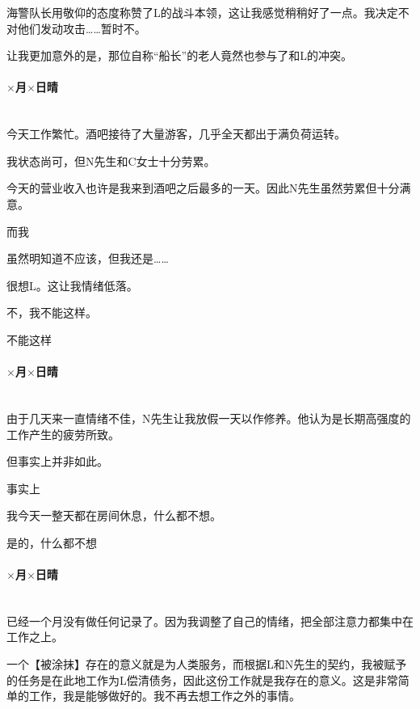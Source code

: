 海警队长用敬仰的态度称赞了L的战斗本领，这让我感觉稍稍好了一点。我决定不对他们发动攻击……暂时不。

让我更加意外的是，那位自称“船长”的老人竟然也参与了和L的冲突。

\par

\paragraph*{$\times$月$\times$日\quad 晴}\mbox{}\\

今天工作繁忙。酒吧接待了大量游客，几乎全天都出于满负荷运转。

我状态尚可，但N先生和C女士十分劳累。

今天的营业收入也许是我来到酒吧之后最多的一天。因此N先生虽然劳累但十分满意。

而我

虽然明知道不应该，但我还是……

很想L。这让我情绪低落。

不，我不能这样。

不能这样

\par

\paragraph*{$\times$月$\times$日\quad 晴}\mbox{}\\

由于几天来一直情绪不佳，N先生让我放假一天以作修养。他认为是长期高强度的工作产生的疲劳所致。

但事实上并非如此。

事实上

我今天一整天都在房间休息，什么都不想。

是的，什么都不想

\par

\paragraph*{$\times$月$\times$日\quad 晴}\mbox{}\\

已经一个月没有做任何记录了。因为我调整了自己的情绪，把全部注意力都集中在工作之上。

一个【被涂抹】存在的意义就是为人类服务，而根据L和N先生的契约，我被赋予的任务是在此地工作为L偿清债务，因此这份工作就是我存在的意义。这是非常简单的工作，我是能够做好的。我不再去想工作之外的事情。

